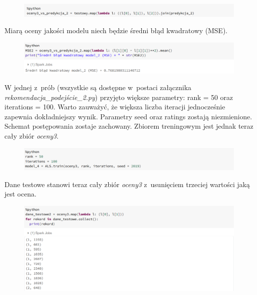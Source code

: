 \documentclass[12pt,a4paper]{report}
\begin{document}
\begin{figure}[H]
\includegraphics[scale=0.5]{obrazy/ALS11.PNG} 
\end{figure}

Miarą oceny jakości modelu niech będzie średni błąd kwadratowy (MSE).

\begin{figure}[H]
\includegraphics[scale=0.5]{obrazy/ALS12.PNG} 
\end{figure}

W jednej z~prób (wszystkie są dostępne w~postaci załącznika \textit{rekomendacja\_podejście\_2.py}) przyjęto większe parametry: rank = 50 oraz iterations = 100. Warto zauważyć, że większa liczba iteracji jednocześnie zapewnia dokładniejszy wynik. Parametry seed oraz ratings zostają niezmienione. Schemat postępowania zostaje zachowany. Zbiorem treningowym jest jednak teraz cały zbiór \textit{oceny3}.

\begin{figure}[H]
\includegraphics[scale=0.5]{obrazy/ALS13.PNG} 
\end{figure}

Dane testowe stanowi teraz cały zbiór \textit{oceny3} z~usunięciem trzeciej wartości jaką jest ocena.

\begin{figure}[H]
\includegraphics[scale=0.5]{obrazy/ALS14.PNG} 
\end{figure}
\end{document}
